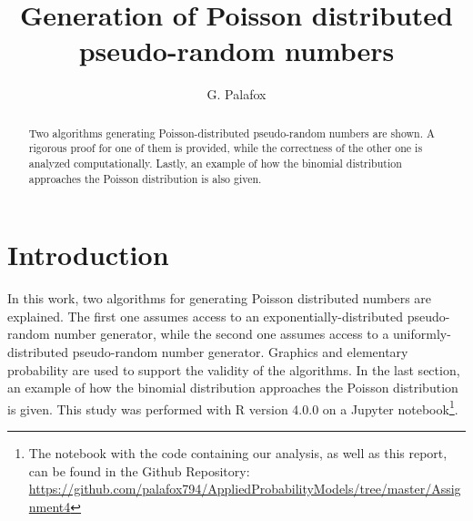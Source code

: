 \documentclass[letterpaper, 10 pt, conference]{article}
\title{Generation of Poisson distributed pseudo-random numbers}
\author{G. Palafox}
\begin{document}
\maketitle

\begin{abstract}
Two algorithms generating Poisson-distributed pseudo-random numbers are shown. A rigorous proof for one of them is provided, while the correctness of the other one is analyzed computationally. Lastly, an example of how the binomial distribution approaches the Poisson distribution is also given.
\end{abstract}

\section{Introduction}
In this work, two algorithms for generating Poisson distributed numbers are explained. The first one assumes access to an exponentially-distributed pseudo-random number generator, while the second one assumes access to a uniformly-distributed pseudo-random number generator. Graphics and elementary probability are used to support the validity of the algorithms. In the last section, an example of how the binomial distribution approaches the Poisson distribution is given. This study was performed with R version 4.0.0 \cite{R} on a Jupyter \cite{jupyter} notebook\footnote{The notebook with the code containing our analysis, as well as this report, can be found in the Github Repository: \url{https://github.com/palafox794/AppliedProbabilityModels/tree/master/Assignment4}}. 
\end{document}
